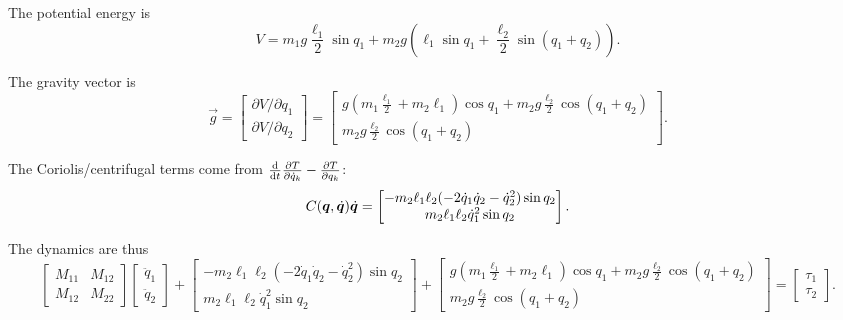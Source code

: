 The potential energy is
\begin{equation}
V = m_1 g \frac{\ell_1}{2}\sin q_1 + m_2 g(\ell_1\sin q_1 + \frac{\ell_2}{2}\sin(q_1+q_2)).
\end{equation}

The gravity vector is
\begin{equation}
\vec{g} = \begin{bmatrix} \partial V/\partial q_1 \\ \partial V/\partial q_2\end{bmatrix}
= \begin{bmatrix}
g(m_1\frac{\ell_1}{2} + m_2\ell_1)\cos q_1 + m_2 g\frac{\ell_2}{2}\cos(q_1+q_2) \\
m_2 g\frac{\ell_2}{2}\cos(q_1+q_2)
\end{bmatrix}.
\end{equation}

The Coriolis/centrifugal terms come from $\frac{\mathrm{d}}{\mathrm{d} t}\frac{\partial T}{\partial\dot q_k} - \frac{\partial T}{\partial q_k}$:
\begin{equation}
C(\bm{q},\dot{\bm{q}})\dot{\bm{q}} = \begin{bmatrix}
-m_2\ell_1\ell_2(-2\dot q_1\dot q_2 - \dot q_2^2)\sin q_2 \\
m_2\ell_1\ell_2\dot q_1^2\sin q_2
\end{bmatrix}.
\end{equation}

The dynamics are thus
\begin{equation}
\begin{bmatrix} M_{11} & M_{12} \\ M_{12} & M_{22}\end{bmatrix}
\begin{bmatrix}\ddot q_1 \\ \ddot q_2\end{bmatrix}
+ \begin{bmatrix}
-m_2\ell_1\ell_2(-2\dot q_1\dot q_2 - \dot q_2^2)\sin q_2 \\
m_2\ell_1\ell_2\dot q_1^2\sin q_2
\end{bmatrix}
+ \begin{bmatrix}
g(m_1\frac{\ell_1}{2} + m_2\ell_1)\cos q_1 + m_2 g\frac{\ell_2}{2}\cos(q_1+q_2) \\
m_2 g\frac{\ell_2}{2}\cos(q_1+q_2)
\end{bmatrix}
= \begin{bmatrix}\tau_1 \\ \tau_2\end{bmatrix}.
\end{equation}

